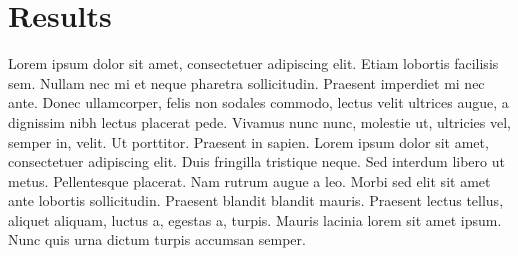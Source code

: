\chapter{Results}
Lorem ipsum dolor sit amet, consectetuer adipiscing elit. Etiam lobortis facilisis
sem. Nullam nec mi et neque pharetra sollicitudin. Praesent imperdiet mi nec
ante. Donec ullamcorper, felis non sodales commodo, lectus velit ultrices augue,
a dignissim nibh lectus placerat pede. Vivamus nunc nunc, molestie ut, ultricies
vel, semper in, velit. Ut porttitor. Praesent in sapien. Lorem ipsum dolor sit
amet, consectetuer adipiscing elit. Duis fringilla tristique neque. Sed interdum
libero ut metus. Pellentesque placerat. Nam rutrum augue a leo. Morbi sed elit
sit amet ante lobortis sollicitudin. Praesent blandit blandit mauris. Praesent
lectus tellus, aliquet aliquam, luctus a, egestas a, turpis. Mauris lacinia lorem
sit amet ipsum. Nunc quis urna dictum turpis accumsan semper.